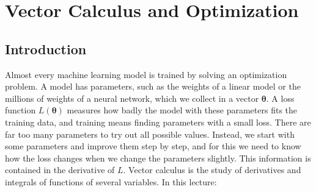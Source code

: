 \chapter{Vector Calculus and Optimization}\label{L3-chapter}
\begingroup
\section*{Introduction}

Almost every machine learning model is trained by solving an optimization problem. A model has parameters, such as the weights of a linear model or the millions of weights of a neural network, which we collect in a vector $\boldsymbol{\theta}$. A loss function $L(\boldsymbol{\theta})$ measures how badly the model with these parameters fits the training data, and training means finding parameters with a small loss. There are far too many parameters to try out all possible values. Instead, we start with some parameters and improve them step by step, and for this we need to know how the loss changes when we change the parameters slightly. This information is contained in the derivative of $L$. Vector calculus is the study of derivatives and integrals of functions of several variables. In this lecture:
